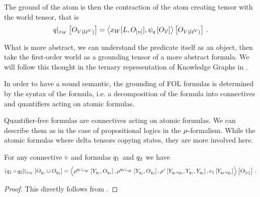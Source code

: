 The ground of the atom is then the contraction of the atom creating tensor with the world tensor, that is
\begin{align*}
    {q}|_{x_{W}} \left[O_{V(\mathcal{U}^{V})}\right]
    = \left\langle x_{W}[L,O_{[n]}], \psi_{q}\left[O_{\mathcal{V}}\right]\right\rangle \left[ O_{V(\mathcal{U}^{V})} \right] \, .
\end{align*}


What is more abstract, we can understand the predicate itself as an object, then take the first-order world as a grounding tensor of a more abstract formula.
We will follow this thought in the ternary representation of Knowledge Graphs in .




\label{sec:folConnectiveRepresentation}

In order to have a sound semantic, the grounding of FOL formulas is determined by the syntax of the formula, i.e. a decomposition of the formula into connectives and quantifiers acting on atomic formulas.

Quantifier-free formulas are connectives acting on atomic formulas.
We can describe them as in the case of propositional logics in the $\rho^{}$-formalism.
While the atomic formulas where delta tensors copying states, they are more involved here.



\begin{theorem}
    For any connective $\circ$ and formulas $q_1$ and $q_2$ we have
    \begin{align}
        {(q_1\circ q_2)}|_{x_{W}} \left[O_{q_1}\cup O_{q_2}\right] =
        \left\langle 
            \rho^{{q_1}|_{x_{W}}}\left[Y_{q_1},O_{q_1}\right],
            \rho^{{q_2}|_{x_{W}}}\left[Y_{q_2},O_{q_2}\right],
            \rho^{\circ}\left[Y_{q_1\circ q_2}, Y_{q_1}, Y_{q_2}\right],
            e_1\left[Y_{q_1\circ q_2}\right]
        \right\rangle \left[ O_{[n]} \right] \, .
    \end{align}
\end{theorem}
\begin{proof}
    This directly follows from .
\end{proof}

